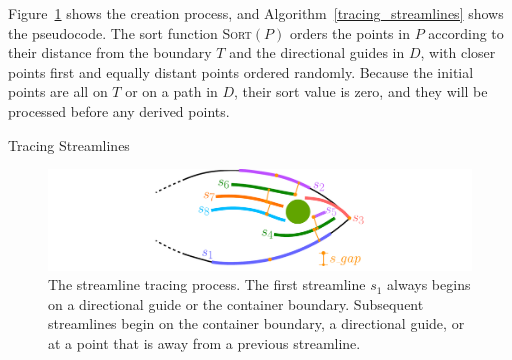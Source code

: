 Figure~\ref{streamline_tracing} shows the creation process, and 
Algorithm~\ref{tracing_streamlines} shows the pseudocode.
The sort function \textsc{Sort}$(P)$ orders the points in $P$ according to their distance from the
boundary $T$ and the directional guides in $D$, with closer points first and equally distant
points ordered randomly. Because the initial points are all on $T$ or on a path in $D$, their
sort value is zero, and they will be processed before any derived points. 

\begin{algorithm}[h!]
\caption{Tracing Streamlines} 
\label{tracing_streamlines}
\end{algorithm}

\begin{figure}[h!]
\centering
\includegraphics[width=1.0\textwidth]{figures/flowpak/streamline_tracing.pdf}
\caption[The streamline tracing process]
{\label{streamline_tracing}
The streamline tracing process. The first streamline $s_1$ always begins
on a directional guide or the container boundary.  Subsequent streamlines begin
on the container boundary, a directional guide, or at a point that is 
 away from a previous streamline.}
\end{figure}

